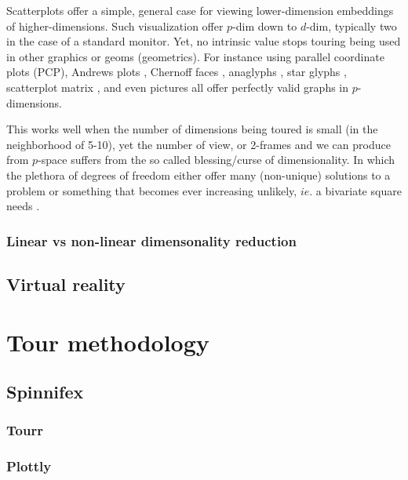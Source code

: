 \documentclass{monashthesis}
\begin{document}
Scatterplots offer a simple, general case for viewing lower-dimension
embeddings of higher-dimensions. Such visualization offer \(p\)-dim down
to \(d\)-dim, typically two in the case of a standard monitor. Yet, no
intrinsic value stops touring being used in other graphics or geoms
(geometrics). For instance using parallel coordinate plots
(PCP)\autocite{ocagne_coordonnees_1885}, Andrews plots
\autocite{andrews_plots_1972}, Chernoff faces
\autocite{chernoff_use_1973}, anaglyphs \autocite{rollmann_zwei_1853},
star glyphs \autocite{siegel_surgical_1972}, scatterplot matrix
\autocite{chambers_graphical_1983}, and even pictures all offer
perfectly valid graphs in \(p\)-dimensions.

This works well when the number of dimensions being toured is small (in
the neighborhood of 5-10), yet the number of view, or 2-frames and we
can produce from \(p\)-space suffers from the so called blessing/curse
of dimensionality. In which the plethora of degrees of freedom either
offer many (non-unique) solutions to a problem or something that becomes
ever increasing unlikely, \(ie.\) a bivariate square needs .

\subsection{Linear vs non-linear dimensonality
reduction}\label{linear-vs-non-linear-dimensonality-reduction}

\section{Virtual reality}\label{virtual-reality}

\chapter{Tour methodology}\label{ch:tour}

\section{Spinnifex}\label{spinnifex}

\subsection{Tourr}\label{tourr}

\subsection{Plottly}\label{plottly}
\end{document}
